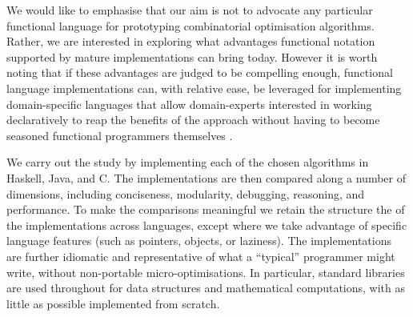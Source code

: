 We would like to emphasise that our aim is not to advocate any particular
functional language for prototyping combinatorial optimisation algorithms.
Rather, we are interested in exploring what advantages functional notation
supported by mature implementations can bring today. However it is
worth noting that if these
advantages are judged to be compelling enough, functional
language implementations can, with relative ease, be leveraged for
implementing domain-specific languages that allow domain-experts interested in
working declaratively to reap the benefits of the approach without having to
become seasoned functional programmers themselves \cite{Hudak1998}.

We carry out the study by implementing each of the chosen algorithms in
Haskell, Java, and C. The implementations are then compared along a number
of dimensions, including conciseness, modularity, debugging, reasoning, and
performance. To make the comparisons meaningful we retain the structure the
of the implementations across languages, except where we take advantage of
specific language features (such as pointers, objects, or laziness). The
implementations are further idiomatic and representative of what a
``typical'' programmer might write, without non-portable micro-optimisations.
In particular, standard libraries are used throughout for data structures and
mathematical computations, with as little as possible implemented from
scratch.

